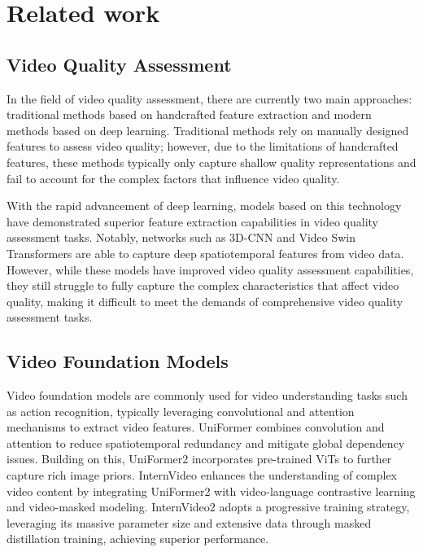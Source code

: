 \section{Related work}
\subsection{Video Quality Assessment}
In the field of video quality assessment, there are currently two main approaches: traditional methods based on handcrafted feature extraction and modern methods based on deep learning. Traditional methods\citep{ mittal2015completely,liao2022exploring,korhonen2019two} rely on manually designed features to assess video quality; however, due to the limitations of handcrafted features, these methods typically only capture shallow quality representations and fail to account for the complex factors that influence video quality.

With the rapid advancement of deep learning, models\citep{simpleVQA,fastVQA,kvq, SwinVQA,SFIQA,AIGCVQA} based on this technology have demonstrated superior feature extraction capabilities in video quality assessment tasks. Notably, networks such as 3D-CNN\citep{3D-CNN} and Video Swin Transformers\citep{swin3D} are able to capture deep spatiotemporal features from video data. However, while these models have improved video quality assessment capabilities, they still struggle to fully capture the complex characteristics that affect video quality, making it difficult to meet the demands of comprehensive video quality assessment tasks.

\subsection{Video Foundation Models}

Video foundation models are commonly used for video understanding tasks such as action recognition, typically leveraging convolutional\citep{3D-CNN} and attention mechanisms\citep{swin3D} to extract video features. UniFormer\citep{uniformer} combines convolution and attention to reduce spatiotemporal redundancy and mitigate global dependency issues. Building on this, UniFormer2\citep{uniformerv2} incorporates pre-trained ViTs to further capture rich image priors. InternVideo\citep{internvideo} enhances the understanding of complex video content by integrating UniFormer2 with video-language contrastive learning and video-masked modeling. InternVideo2\citep{internvideo2} adopts a progressive training strategy, leveraging its massive parameter size and extensive data through masked distillation training, achieving superior performance.